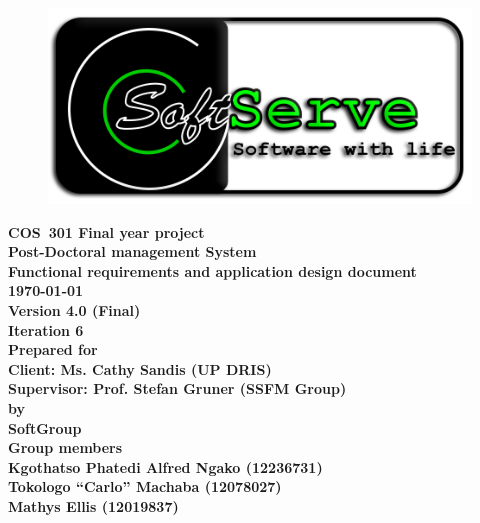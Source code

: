 \documentclass[12pt]{article}
\newcommand{\Title}{Functional requirements and application design document} %
\newcommand{\Class}{COS\ 301 Final year project} %
\newcommand{\ssr}{Soft\color{green}{Serve }\color{black}}
\newcommand{\version}{4.0 (Final)}
\newcommand{\iteration}{6}
\newcommand{\client}{Ms. Cathy Sandis (UP DRIS)}
\newcommand{\supervisor}{Prof. Stefan Gruner (SSFM Group)}
\newcommand{\project}{Post-Doctoral management System}
\begin{document}
\vspace{4em}

\begin{center}%

\begin{figure}[ht!]
\centering
\includegraphics{../Images_Docs/logo.png}
\end{figure}
\LARGE \bf \Class \\[0.25em]
\LARGE \bf \project \\[1em]
\LARGE \bf \Title \\[0.25em]
\large \bf \today\\
\bf Version \version\\
\bf Iteration \iteration\\[0.5em]
\Large \bf Prepared for \\Client: \client\\Supervisor: \supervisor
\Large \\\bf by \\
\Large {\bf \ssr Group }\\[0.5em]
\LARGE {\bf Group members}\\[0.25em]
\large
Kgothatso Phatedi Alfred Ngako (12236731) \\[0.5em]
Tokologo “Carlo” Machaba (12078027) \\[0.5em]
Mathys Ellis (12019837) \\[8em]

\end{center}%

\end{document}
